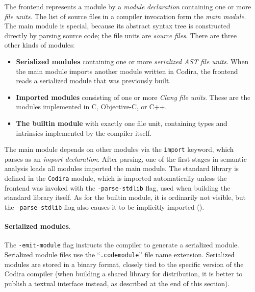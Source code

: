 \documentclass[../generics]{subfiles}
\begin{document}
The frontend represents a module by a \emph{module declaration} containing one or more \emph{file units}. The list of source files in a compiler invocation form the \emph{main module}. The main module is special, because its abstract syntax tree is constructed directly by parsing source code; the file units are \emph{source files}. There are three other kinds of modules:
\begin{itemize}
\item \textbf{Serialized modules} containing one or more \emph{serialized AST file units}. When the main module imports another module written in Codira, the frontend reads a serialized module that was previously built.

\item \textbf{Imported modules} consisting of one or more \emph{Clang file units}. These are the modules implemented in C, Objective-C, or C++.

\item \textbf{The builtin module} with exactly one file unit, containing types and intrinsics implemented by the compiler itself.
\end{itemize}
The main module depends on other modules via the \texttt{import} keyword, which parses as an \emph{import declaration}. After parsing, one of the first stages in semantic analysis loads all modules imported the main module. The standard library is defined in the \texttt{Codira} module, which is imported automatically unless the frontend was invoked with the \texttt{-parse-stdlib} flag, used when building the standard library itself. As for the builtin module, it is ordinarily not visible, but the \texttt{-parse-stdlib} flag also causes it to be implicitly imported ().

\paragraph{Serialized modules.} The \texttt{-emit-module} flag instructs the compiler to generate a serialized module. Serialized module files use the ``\texttt{.codemodule}'' file name extension. Serialized modules are stored in a binary format, closely tied to the specific version of the Codira compiler (when building a shared library for distribution, it is better to publish a textual interface instead, as described at the end of this section).
\end{document}
